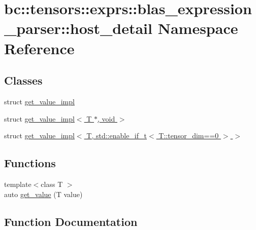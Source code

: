 \hypertarget{namespacebc_1_1tensors_1_1exprs_1_1blas__expression__parser_1_1host__detail}{}\section{bc\+:\+:tensors\+:\+:exprs\+:\+:blas\+\_\+expression\+\_\+parser\+:\+:host\+\_\+detail Namespace Reference}
\label{namespacebc_1_1tensors_1_1exprs_1_1blas__expression__parser_1_1host__detail}
\subsection*{Classes}
\begin{DoxyCompactItemize}
\item 
struct \hyperlink{structbc_1_1tensors_1_1exprs_1_1blas__expression__parser_1_1host__detail_1_1get__value__impl}{get\+\_\+value\+\_\+impl}
\item 
struct \hyperlink{structbc_1_1tensors_1_1exprs_1_1blas__expression__parser_1_1host__detail_1_1get__value__impl_3_01T_01_5_00_01void_01_4}{get\+\_\+value\+\_\+impl$<$ T $\ast$, void $>$}
\item 
struct \hyperlink{structbc_1_1tensors_1_1exprs_1_1blas__expression__parser_1_1host__detail_1_1get__value__impl_3_07516853a14565d1be7ad17f674a5228e}{get\+\_\+value\+\_\+impl$<$ T, std\+::enable\+\_\+if\+\_\+t$<$ T\+::tensor\+\_\+dim==0 $>$ $>$}
\end{DoxyCompactItemize}
\subsection*{Functions}
\begin{DoxyCompactItemize}
\item 
{\footnotesize template$<$class T $>$ }\\auto \hyperlink{namespacebc_1_1tensors_1_1exprs_1_1blas__expression__parser_1_1host__detail_ac83b57f2d37152b60232ac0658a12427}{get\+\_\+value} (T value)
\end{DoxyCompactItemize}


\subsection{Function Documentation}
\mbox{\label{namespacebc_1_1tensors_1_1exprs_1_1blas__expression__parser_1_1host__detail_ac83b57f2d37152b60232ac0658a12427}} 
